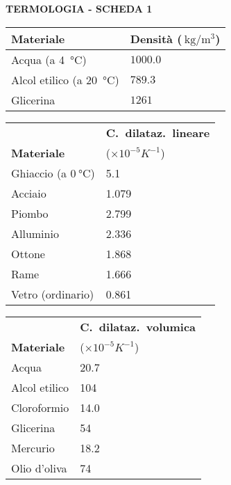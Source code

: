 
\begin{center}
    \textbf{\Large \sffamily TERMOLOGIA - SCHEDA 1}
\end{center}\vspace{\baselineskip}

\noindent\centering\begin{tabular}{ll}
    \textbf{Materiale}  & \textbf{Densità} ($\SI{}{\kilogram/\meter^3}$) \\ \hline
    Acqua (a \SI{4}{\celsius}) & $\num{1000.0}$\\ \hline
    Alcol etilico (a \SI{20}{\celsius}) & $\num{789.3}$\\ \hline
    Glicerina & $\num{1261}$\\ \hline
\end{tabular}\vspace{\baselineskip}

\noindent\begin{tabular}{ll}
    & \textbf{C.\ dilataz.\ lineare} \\
    \textbf{Materiale} & ($\times 10^{-5}K^{-1}$)\\ \hline
    Ghiaccio (a $\SI{0}{\celsius}$)  & 5.1\\ \hline
    Acciaio & 1.079\\ \hline
    Piombo & 2.799\\ \hline
    Alluminio & 2.336\\ \hline
    Ottone & 1.868\\ \hline
    Rame & 1.666\\ \hline
    Vetro (ordinario) & 0.861\\ \hline
\end{tabular}
\hfill
\noindent\begin{tabular}{ll}
    & \textbf{C.\ dilataz.\ volumica} \\
    \textbf{Materiale} & ($\times 10^{-5}K^{-1}$)\\ \hline
    Acqua  & 20.7\\ \hline
    Alcol etilico & 104\\ \hline
    Cloroformio & 14.0\\ \hline
    Glicerina & 54\\ \hline
    Mercurio & 18.2\\ \hline
    Olio d'oliva & 74\\ \hline
\end{tabular}\vspace{\baselineskip}


